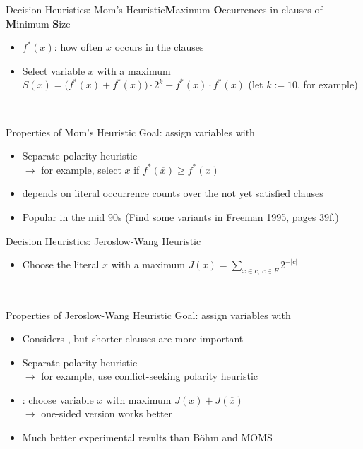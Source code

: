 \documentclass[t]{sdqbeamer}
\begin{document}
\begin{frame}{Decision Heuristics: Mom's Heuristic}{\textbf{M}aximum \textbf{O}ccurrences in clauses of \textbf{M}inimum \textbf{S}ize}
\begin{itemize}\setlength{\itemsep}{1ex}
	\item $f^*(x)$: how often $x$ occurs in the  clauses
	\item Select variable $x$ with a maximum $S(x) = \bigl(f^*(x)+f^*(\overline{x})\bigr) \cdot 2^k + f^*(x) \cdot f^*(\overline{x})$ \quad (let $k:=10$, for example)
\end{itemize}~\\
\begin{blueblock}{Properties of Mom's Heuristic}
Goal: assign variables with \\[1ex]
\begin{itemize}\setlength{\itemsep}{1em}
	\item Separate polarity heuristic\\[1ex]
		$\rightarrow$ for example, select $x$ if $f^*(\overline x) \geq f^*(x)$
	\item depends on literal occurrence counts over the not yet satisfied clauses
	\item Popular in the mid 90s (Find some variants in \href{https://satlecture.github.io/kit2024/references/1995_Freeman_Thesis.ps}{Freeman 1995, pages 39f.})
\end{itemize}
\end{blueblock}
\end{frame}
	
\begin{frame}{Decision Heuristics: Jeroslow-Wang Heuristic}
\begin{itemize}\setlength{\itemsep}{1ex}
	\item Choose the literal $x$ with a maximum $J(x) = \sum_{x \in c,\ c \in F} 2^{-|c|}$
\end{itemize}~\\
\begin{blueblock}{Properties of Jeroslow-Wang Heuristic}
	Goal: assign variables with \\[1ex]
	\begin{itemize}\setlength{\itemsep}{1em}
		\item Considers , but shorter clauses are more important
		\item Separate polarity heuristic\\
		$\rightarrow$ for example, use conflict-seeking polarity heuristic
		\item {}: choose variable $x$ with maximum $J(x)+J(\overline{x})$\\
		$\rightarrow$ one-sided version works better
	\item Much better experimental results than B{\"o}hm and MOMS
\end{itemize}
\end{blueblock}
\end{frame}
	
\end{document}
